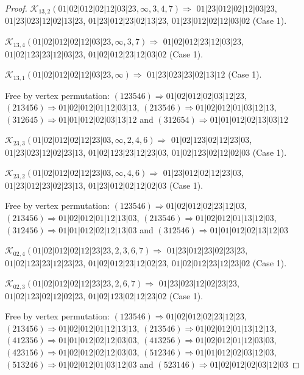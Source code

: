 \documentclass[12pt]{article}
\theoremstyle{plain}
\theoremstyle{definition}
\theoremstyle{remark}
\newcommand{\fancy}[1]{\mathcal{#1}}
\def\K{\fancy{K}}
\begin{document}
\begin{proof}
	
	
	\bigskip
	
	$\K_{13,2}(01|02|012|02|12|03|23,\infty,3, 4, 7)\Rightarrow $ $01|23|012|02|12|03|23$, $01|23|023|12|02|13|23$, $01|23|012|23|02|13|23$, $01|23|012|02|12|03|02$ (Case 1).
	
	$\K_{13,4}(01|02|012|02|12|03|23,\infty,3, 7)\Rightarrow $ $01|02|012|23|12|03|23$, $01|02|123|23|12|03|23$, $01|02|012|23|12|03|02$ (Case 1).
	
	$\K_{13,1}(01|02|012|02|12|03|23,\infty)\Rightarrow $ $01|23|023|23|02|13|12$ (Case 1).
	
	
	
	Free by vertex permutation: $(1 2 3 5 4 6)\Rightarrow 01|02|012|02|03|12|23$, $(2 1 3 4 5 6)\Rightarrow 01|02|012|01|12|03|13$, $(2 1 3 5 4 6)\Rightarrow 01|02|012|01|03|12|13$, $(3 1 2 6 4 5)\Rightarrow 01|01|012|02|03|13|12$ and $(3 1 2 6 5 4)\Rightarrow 01|01|012|02|13|03|12$
	
	
	
	\bigskip
	
	$\K_{23,3}(01|02|012|02|12|23|03,\infty,2, 4, 6)\Rightarrow $ $01|02|123|02|12|23|03$, $01|23|023|12|02|23|13$, $01|02|123|23|12|23|03$, $01|02|123|02|12|02|03$ (Case 1).
	
	$\K_{23,2}(01|02|012|02|12|23|03,\infty,4, 6)\Rightarrow $ $01|23|012|02|12|23|03$, $01|23|012|23|02|23|13$, $01|23|012|02|12|02|03$ (Case 1).
	
	
	
	Free by vertex permutation: $(1 2 3 5 4 6)\Rightarrow 01|02|012|02|23|12|03$, $(2 1 3 4 5 6)\Rightarrow 01|02|012|01|12|13|03$, $(2 1 3 5 4 6)\Rightarrow 01|02|012|01|13|12|03$, $(3 1 2 4 5 6)\Rightarrow 01|01|012|02|12|13|03$ and $(3 1 2 5 4 6)\Rightarrow 01|01|012|02|13|12|03$
	
	
	
	\bigskip
	
	$\K_{02,4}(01|02|012|02|12|23|23,2, 3, 6, 7)\Rightarrow $ $01|23|012|23|02|23|23$, $01|02|123|23|12|23|23$, $01|02|012|23|12|02|23$, $01|02|012|23|12|23|02$ (Case 1).
	
	$\K_{02,3}(01|02|012|02|12|23|23,2, 6, 7)\Rightarrow $ $01|23|023|12|02|23|23$, $01|02|123|02|12|02|23$, $01|02|123|02|12|23|02$ (Case 1).
	
	
	
	Free by vertex permutation: $(1 2 3 5 4 6)\Rightarrow 01|02|012|02|23|12|23$, $(2 1 3 4 5 6)\Rightarrow 01|02|012|01|12|13|13$, $(2 1 3 5 4 6)\Rightarrow 01|02|012|01|13|12|13$, $(4 1 2 3 5 6)\Rightarrow 01|01|012|02|12|03|03$, $(4 1 3 2 5 6)\Rightarrow 01|02|012|01|12|03|03$, $(4 2 3 1 5 6)\Rightarrow 01|02|012|02|12|03|03$, $(5 1 2 3 4 6)\Rightarrow 01|01|012|02|03|12|03$, $(5 1 3 2 4 6)\Rightarrow 01|02|012|01|03|12|03$ and $(5 2 3 1 4 6)\Rightarrow 01|02|012|02|03|12|03$
	

\end{proof}
\end{document}
